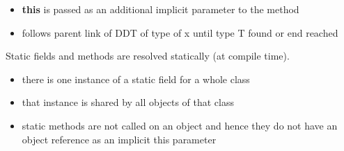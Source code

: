 
\begin{itemize}
    \item \textbf{this} is passed as an additional implicit parameter to the 
    method
\end{itemize}

\begin{itemize}
    \item follows parent link of DDT of type of x until type T found or end reached
\end{itemize}

Static fields and methods are resolved statically (at compile time).
\begin{itemize}
    \item there is one instance of a static field for a whole class
    \item that instance is shared by all objects of that class
    \item static methods are not called on an object and hence they 
    do not have an object reference as an implicit this parameter
\end{itemize}